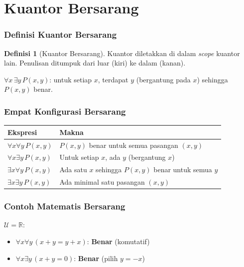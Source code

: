 \documentclass[handout]{beamer}
\theoremstyle{definition}
\newtheorem{definisi}[theorem]{Definisi}
\theoremstyle{example}
\begin{document}
\section{Kuantor Bersarang}

\begin{frame}
\frametitle{Definisi Kuantor Bersarang}
\begin{definisi}[Kuantor Bersarang]
Kuantor diletakkan di dalam \textit{scope} kuantor lain. Penulisan ditumpuk dari luar (kiri) ke dalam (kanan).
\end{definisi}
$\forall x \, \exists y \, P(x,y)$: untuk setiap $x$, terdapat $y$ (bergantung pada $x$) sehingga $P(x,y)$ benar.
\end{frame}

\begin{frame}
\frametitle{Empat Konfigurasi Bersarang}
\begin{center}
\small
\begin{tabular}{|l|l|}
\hline
\textbf{Ekspresi} & \textbf{Makna} \\ \hline
$\forall x \forall y \, P(x,y)$ & $P(x,y)$ benar untuk semua pasangan $(x,y)$ \\ \hline
$\forall x \exists y \, P(x,y)$ & Untuk setiap $x$, ada $y$ (bergantung $x$) \\ \hline
$\exists x \forall y \, P(x,y)$ & Ada satu $x$ sehingga $P(x,y)$ benar untuk semua $y$ \\ \hline
$\exists x \exists y \, P(x,y)$ & Ada minimal satu pasangan $(x,y)$ \\ \hline
\end{tabular}
\end{center}
\end{frame}

\begin{frame}
\frametitle{Contoh Matematis Bersarang}
$\mathcal{U} = \mathbb{R}$:
\begin{itemize}
  \item $\forall x \forall y \, (x+y = y+x)$: \textbf{Benar} (komutatif)
  \item $\forall x \exists y \, (x+y = 0)$: \textbf{Benar} (pilih $y = -x$)
\end{itemize}
\end{frame}

\end{document}
